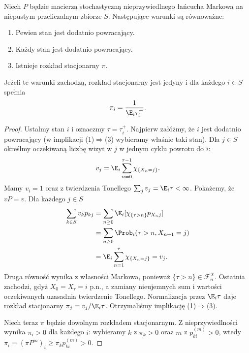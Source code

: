 \begin{twierdzenie}
\label{thm:rp1-12-positive-recurrence}
Niech $P$ będzie macierzą stochastyczną nieprzywiedlnego
łańcucha Markowa na niepustym przeliczalnym zbiorze $S$.
Następujące warunki są równoważne:
\begin{enumerate}
\item Pewien stan jest dodatnio powracający.
\item Każdy stan jest dodatnio powracający.
\item Istnieje rozkład stacjonarny $\pi$.
\end{enumerate}
Jeżeli te warunki zachodzą, rozkład stacjonarny
jest jedyny i dla każdego $i\in S$ spełnia
\[
\pi_i=\frac1{\E_i\tau_i^+}.
\]
\end{twierdzenie}
\begin{proof}
Ustalmy stan $i$ i oznaczmy $\tau=\tau_i^+$.
Najpierw załóżmy, że $i$ jest dodatnio powracający
(w implikacji (1)$\Rightarrow$(3) wybieramy właśnie
taki stan).
Dla $j\in S$ określmy oczekiwaną liczbę wizyt
w $j$ w jednym cyklu powrotu do $i$:
\[
v_j=\E_i\sum_{n=0}^{\tau-1}\chi_{\{X_n=j\}}.
\]
Mamy $v_i=1$ oraz z twierdzenia Tonellego
$\sum_jv_j=\E_i\tau<\infty$.
Pokażemy, że $vP=v$. Dla każdego $j\in S$
\begin{align*}
\sum_{k\in S}v_kp_{kj}
&=\sum_{n\geq0}\E_i[
      \chi_{\{\tau>n\}}p_{X_nj}]\\
&=\sum_{n\geq0}\Prob_i(\tau>n,X_{n+1}=j)\\
&=\E_i\sum_{n=1}^{\tau}\chi_{\{X_n=j\}}=v_j.
\end{align*}
Druga równość wynika z własności Markowa, ponieważ
$\{\tau>n\}\in\mathcal F_n^X$. Ostatnia zachodzi,
gdyż $X_0=X_\tau=i$ p.n., a zamiany nieujemnych
sum i wartości oczekiwanych uzasadnia twierdzenie
Tonellego. Normalizacja przez $\E_i\tau$ daje
rozkład stacjonarny $\pi_j=v_j/\E_i\tau$.
Otrzymaliśmy implikację (1)$\Rightarrow$(3).

Niech teraz $\pi$ będzie dowolnym rozkładem stacjonarnym.
Z nieprzywiedlności wynika $\pi_i>0$ dla każdego $i$:
wybieramy $k$ z $\pi_k>0$ oraz $m$ z $p_{ki}^{(m)}>0$,
wtedy $\pi_i=(\pi P^m)_i\geq\pi_kp_{ki}^{(m)}>0$.


\end{proof}
